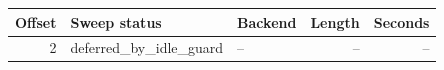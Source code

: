 {\small
\begin{tabular}{rllrr}
\hline
Offset & Sweep status & Backend & Length & Seconds \\
\hline
2 & deferred_by_idle_guard & -- & -- & -- \\
\hline
\end{tabular}
}
